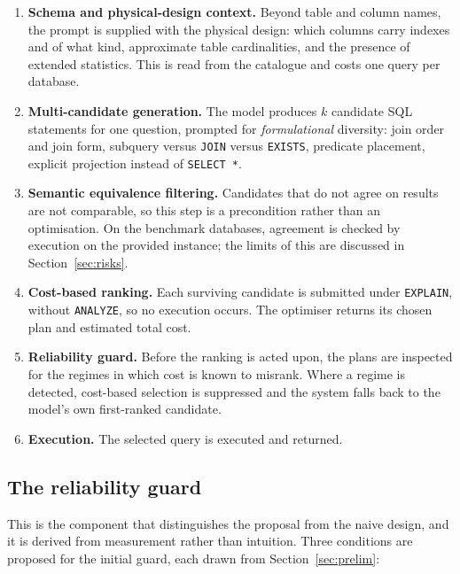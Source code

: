 \documentclass[12pt, a4paper]{article}
\begin{document}
\begin{enumerate}[leftmargin=*, itemsep=0.35em]
\item \textbf{Schema and physical-design context.} Beyond table and
column names, the prompt is supplied with the physical design: which
columns carry indexes and of what kind, approximate table cardinalities,
and the presence of extended statistics. This is read from the
catalogue and costs one query per database.

\item \textbf{Multi-candidate generation.} The model produces $k$
candidate SQL statements for one question, prompted for
\emph{formulational} diversity: join order and join form, subquery
versus \texttt{JOIN} versus \texttt{EXISTS}, predicate placement,
explicit projection instead of \texttt{SELECT *}.

\item \textbf{Semantic equivalence filtering.} Candidates that do not
agree on results are not comparable, so this step is a precondition
rather than an optimisation. On the benchmark databases, agreement is
checked by execution on the provided instance; the limits of this are
discussed in Section~\ref{sec:risks}.

\item \textbf{Cost-based ranking.} Each surviving candidate is submitted
under \texttt{EXPLAIN}, without \texttt{ANALYZE}, so no execution
occurs. The optimiser returns its chosen plan and estimated total cost.

\item \textbf{Reliability guard.} Before the ranking is acted upon, the
plans are inspected for the regimes in which cost is known to misrank.
Where a regime is detected, cost-based selection is suppressed and the
system falls back to the model's own first-ranked candidate.

\item \textbf{Execution.} The selected query is executed and returned.
\end{enumerate}

\subsection{The reliability guard}
\label{sec:guard}

This is the component that distinguishes the proposal from the naive
design, and it is derived from measurement rather than intuition. Three
conditions are proposed for the initial guard, each drawn from
Section~\ref{sec:prelim}:
\end{document}
